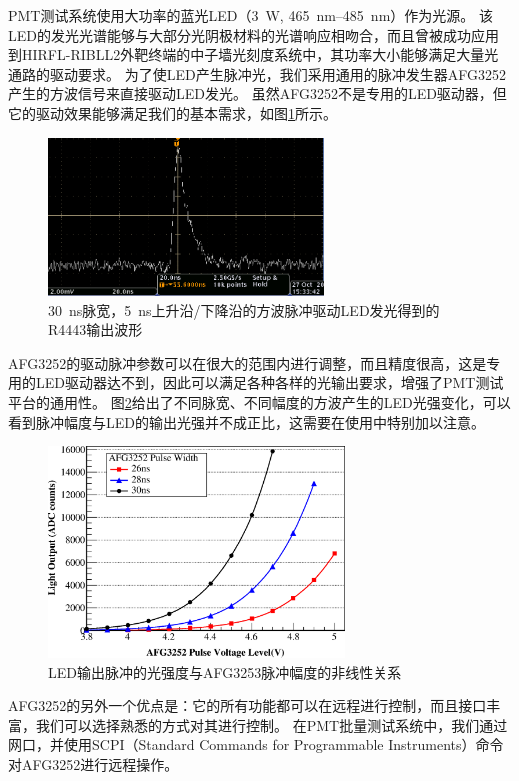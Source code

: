 PMT测试系统使用大功率的蓝光LED（\SI{3}{\watt}, \SIrange{465}{485}{\nano\meter}）作为光源。
该LED的发光光谱能够与大部分光阴极材料的光谱响应相吻合，而且曾被成功应用到HIRFL-RIBLL2外靶终端的中子墙光刻度系统中\parencite{yuyuhong_led}，其功率大小能够满足大量光通路的驱动要求。
为了使LED产生脉冲光，我们采用通用的脉冲发生器AFG3252\parencite{afg3252}产生的方波信号来直接驱动LED发光。
虽然AFG3252不是专用的LED驱动器，但它的驱动效果能够满足我们的基本需求，如图\ref{fig:pmt_test:led_pulse}所示。
\begin{figure}[htbp]
	\centering
	\includegraphics[width=0.65\textwidth]{chap/pmt_test/fig/led_pulse.jpg}
	\caption{\SI{30}{\nano\second}脉宽，\SI{5}{\nano\second}上升沿/下降沿的方波脉冲驱动LED发光得到的R4443输出波形}
	\label{fig:pmt_test:led_pulse}
\end{figure}
AFG3252的驱动脉冲参数可以在很大的范围内进行调整，而且精度很高，这是专用的LED驱动器达不到，因此可以满足各种各样的光输出要求，增强了PMT测试平台的通用性。
图\ref{fig:pmt_test:led_response}给出了不同脉宽、不同幅度的方波产生的LED光强变化，可以看到脉冲幅度与LED的输出光强并不成正比，这需要在使用中特别加以注意。
\begin{figure}[htbp]
	\centering
	\includegraphics[width=0.7\textwidth]{chap/pmt_test/fig/led_response.eps}
	\caption{LED输出脉冲的光强度与AFG3253脉冲幅度的非线性关系}
	\label{fig:pmt_test:led_response}
\end{figure}
AFG3252的另外一个优点是：它的所有功能都可以在远程进行控制，而且接口丰富，我们可以选择熟悉的方式对其进行控制。
在PMT批量测试系统中，我们通过网口，并使用SCPI（Standard Commands for Programmable Instruments）命令\parencite{afg3000_programmer_manual}对AFG3252进行远程操作。

